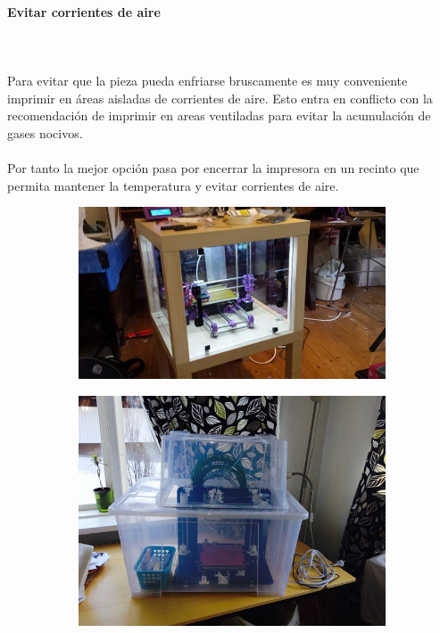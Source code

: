 \documentclass[11pt,a4paper]{article}
\begin{document}
			\paragraph{Evitar corrientes de aire}\mbox{}\\\\
Para evitar que la pieza pueda enfriarse bruscamente es muy conveniente imprimir en áreas aisladas de corrientes de aire. Esto entra en conflicto con la recomendación de imprimir en areas ventiladas para evitar la acumulación de gases nocivos.
\\\\
Por tanto la mejor opción pasa por encerrar la impresora en un recinto que permita mantener la temperatura y evitar corrientes de aire.
\begin{figure}[H]
    \centering
    \begin{subfigure}[b]{0.3\textwidth}
        \includegraphics[width=\textwidth,cfbox=azul_marcos 4pt 0pt]{FOTOS/CERRAMIENTO1}
    \end{subfigure}
    \quad %
    \begin{subfigure}[b]{0.3\textwidth}
        \includegraphics[width=\textwidth,cfbox=azul_marcos 4pt 0pt]{FOTOS/CERRAMIENTO2}

\end{subfigure}
\end{figure}
\end{document}
